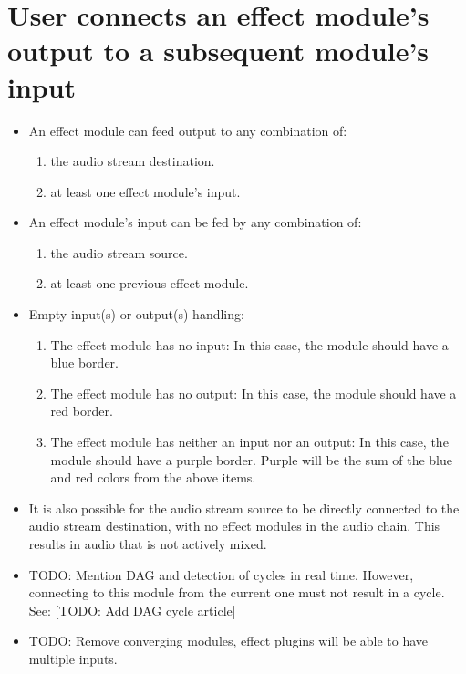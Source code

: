 \section{User connects an effect module's output to a subsequent module's input}


\begin{itemize}
	\item An effect module can feed output to any combination of:
	\begin{enumerate}
		\item the audio stream destination. 
		\item at least one effect module's input.
	\end{enumerate}
	
	
	
	\item An effect module's input can be fed by any combination of:
	\begin{enumerate}
		\item the audio stream source.
		\item at least one previous effect module.
	\end{enumerate}


	\item Empty input(s) or output(s) handling:
	\begin{enumerate}
		\item The effect module has no input: In this case, the module should have a blue border.
		\item The effect module has no output: In this case, the module should have a red border.
		\item The effect module has neither an input nor an output: In this case, the module should have a purple border. Purple will be the sum of the blue and red colors from the above items.
	\end{enumerate}

	\item It is also possible for the audio stream source to be directly connected to the audio stream destination, with no effect modules in the audio chain. This results in audio that is not actively mixed.

	
	\item TODO: Mention DAG and detection of cycles in real time. However, connecting to this module from the current one must not result in a cycle. See: [TODO: Add DAG cycle article]


	\item TODO: Remove converging modules, effect plugins will be able to have multiple inputs.



\end{itemize}